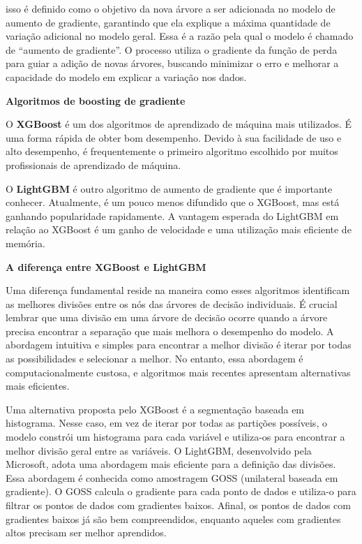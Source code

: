 \noindent isso é definido como o objetivo da nova árvore a ser adicionada no modelo de aumento de gradiente, garantindo que ela explique a máxima quantidade de variação adicional no modelo geral. Essa é a razão pela qual o modelo é chamado de ``aumento de gradiente''. O processo utiliza o gradiente da função de perda para guiar a adição de novas árvores, buscando minimizar o erro e melhorar a capacidade do modelo em explicar a variação nos dados.

\noindent\textbf{Algoritmos de boosting de gradiente}

O \textbf{XGBoost} é um dos algoritmos de aprendizado de máquina mais utilizados. É uma forma rápida de obter bom desempenho. Devido à sua facilidade de uso e alto desempenho, é frequentemente o primeiro algoritmo escolhido por muitos profissionais de aprendizado de máquina.

O \textbf{LightGBM} é outro algoritmo de aumento de gradiente que é importante conhecer. Atualmente, é um pouco menos difundido que o XGBoost, mas está ganhando popularidade rapidamente. A vantagem esperada do LightGBM em relação ao XGBoost é um ganho de velocidade e uma utilização mais eficiente de memória.


\noindent\textbf{A diferen\c ca entre XGBoost e LightGBM}

Uma diferença fundamental reside na maneira como esses algoritmos identificam as melhores divisões entre os nós das árvores de decisão individuais. É crucial lembrar que uma divisão em uma árvore de decisão ocorre quando a árvore precisa encontrar a separação que mais melhora o desempenho do modelo.
A abordagem intuitiva e simples para encontrar a melhor divisão é iterar por todas as possibilidades e selecionar a melhor. No entanto, essa abordagem é computacionalmente custosa, e algoritmos mais recentes apresentam alternativas mais eficientes.

Uma alternativa proposta pelo XGBoost é a segmentação baseada em histograma. Nesse caso, em vez de iterar por todas as partições possíveis, o modelo constrói um histograma para cada variável e utiliza-os para encontrar a melhor divisão geral entre as variáveis.
O LightGBM, desenvolvido pela Microsoft, adota uma abordagem mais eficiente para a definição das divisões. Essa abordagem é conhecida como amostragem GOSS (unilateral baseada em gradiente). O GOSS calcula o gradiente para cada ponto de dados e utiliza-o para filtrar os pontos de dados com gradientes baixos. Afinal, os pontos de dados com gradientes baixos já são bem compreendidos, enquanto aqueles com gradientes altos precisam ser melhor aprendidos.

